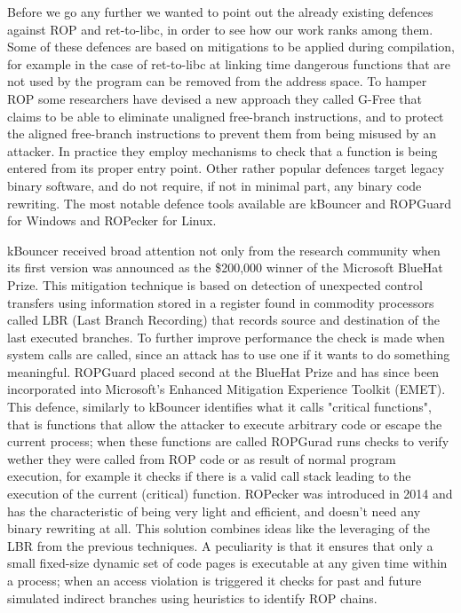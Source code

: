\documentclass[Lau,binding=0.6cm]{sapthesis}
\begin{document}
Before we go any further we wanted to point out the already existing defences against ROP and ret-to-libc, in order to see how our work ranks among them. Some of these defences are based on mitigations to be applied during compilation, for example in the case of ret-to-libc at linking time dangerous functions that are not used by the program can be removed from the address space. To hamper ROP some researchers have devised a new approach they called G-Free that claims to be able to eliminate unaligned free-branch instructions, and to protect the aligned free-branch instructions to prevent them from being misused by an attacker. In practice they employ mechanisms to check that a function is being entered from its proper entry point. Other rather popular defences target legacy binary software, and do not require, if not in minimal part, any binary code rewriting. The most notable defence tools available are kBouncer and ROPGuard for Windows and ROPecker for Linux. 

kBouncer received broad attention not only from the research community when its first version was announced as the \$200,000 winner of the Microsoft BlueHat Prize. This mitigation technique is based on detection of unexpected control transfers using information stored in a register found in commodity processors called LBR (Last Branch Recording) that records source and destination of the last executed branches. To further improve performance the check is made when system calls are called, since an attack has to use one if it wants to do something meaningful.
ROPGuard placed second at the BlueHat Prize and has since been incorporated into Microsoft’s Enhanced Mitigation Experience Toolkit (EMET). This defence, similarly to kBouncer identifies what it calls "critical functions", that is functions that allow the attacker to execute arbitrary code or escape the current process; when these functions are called ROPGurad runs checks to verify wether they were called from ROP code or as result of normal program execution, for example it checks if there is a valid call stack leading to the execution of the current (critical) function.  
ROPecker was introduced in 2014 and has the characteristic of being very light and efficient, and doesn't need any binary rewriting at all. This solution combines ideas like the leveraging of the LBR from the previous techniques. A peculiarity is that it ensures that only a small fixed-size dynamic set of code pages is executable at any given time within a process; when an access violation is triggered it checks for past and future simulated indirect branches using heuristics to identify ROP chains.
\end{document}
